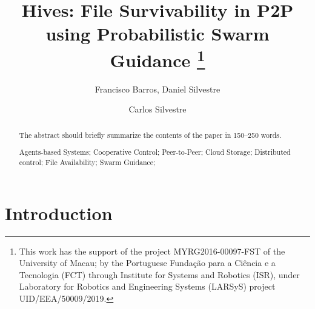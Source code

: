 \documentclass[runningheads]{llncs}
\begin{document}
\title {Hives: File Survivability in P2P using Probabilistic Swarm Guidance
\thanks{This work has the support of the project MYRG2016-00097-FST of the University of Macau; by the Portuguese Fundação para a Ciência e a Tecnologia (FCT) through Institute for Systems and Robotics (ISR), under Laboratory for Robotics and Engineering Systems (LARSyS) project UID/EEA/50009/2019.}
}
\author{Francisco Barros, Daniel Silvestre \and Carlos Silvestre}
\maketitle
\begin{abstract}
The abstract should briefly summarize the contents of the paper in 150--250 words.
\begin{keywords}Agents-based Systems; Cooperative Control; Peer-to-Peer; Cloud Storage; Distributed control; File Availability; Swarm Guidance;\end{keywords}
\end{abstract}

\setcounter{tocdepth}{3}
\tableofcontents

\newpage\section{Introduction}\label{sec:intro}
\end{document}
